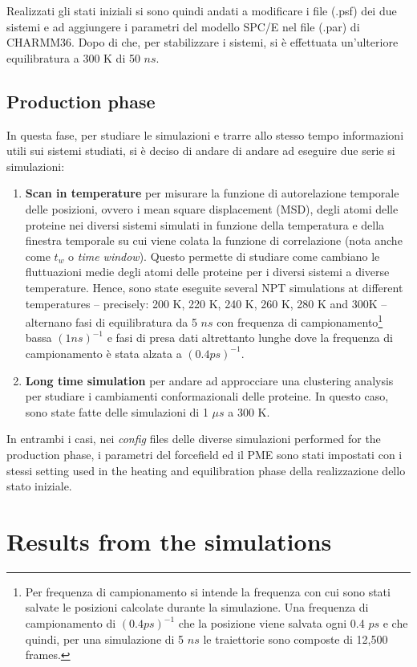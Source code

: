 Realizzati gli stati iniziali si sono quindi andati a modificare i file (.psf) dei due sistemi e ad aggiungere i parametri del modello SPC/E nel file (.par) di CHARMM36. Dopo di che, per stabilizzare i sistemi, si è effettuata un'ulteriore equilibratura a 300 K di 50 $ns$.

\subsection{Production phase}
In questa fase, per studiare le simulazioni e trarre allo stesso tempo informazioni utili sui sistemi studiati, si è deciso di andare di andare ad eseguire due serie si simulazioni:
\begin{enumerate}
\item \textbf{Scan in temperature} per misurare la funzione di autorelazione temporale delle posizioni, ovvero i mean square displacement (MSD), degli atomi delle proteine nei diversi sistemi simulati in funzione della temperatura e della finestra temporale su cui viene colata la funzione di correlazione (nota anche come $t_w$ o \textit{time window}). Questo permette di studiare come cambiano le fluttuazioni medie degli atomi delle proteine per i diversi sistemi a diverse temperature. Hence, sono state eseguite several NPT simulations at different temperatures -- precisely: 200 K, 220 K, 240 K, 260 K, 280 K and 300K -- alternano fasi di equilibratura da 5 $ns$ con frequenza di campionamento\footnote{Per frequenza di campionamento si intende la frequenza con cui sono stati salvate le posizioni calcolate durante la simulazione. Una frequenza di campionamento di $(0.4 ps)^{-1}$ che la posizione viene salvata ogni 0.4 $ps$ e che quindi, per una simulazione di 5 $ns$ le traiettorie sono composte di 12,500 frames.} bassa $(1 ns)^{-1}$ e fasi di presa dati altrettanto lunghe dove la frequenza di campionamento è stata alzata a $(0.4 ps)^{-1}$. 
\item \textbf{Long time simulation} per andare ad approcciare una clustering analysis per studiare i cambiamenti conformazionali delle proteine. In questo caso, sono state fatte delle simulazioni di 1 $\mu s$ a 300 K. 
\end{enumerate}
In entrambi i casi, nei \textit{config} files delle diverse simulazioni performed for the production phase, i parametri del forcefield ed il PME sono stati impostati con i stessi setting used in the heating and equilibration phase della realizzazione dello stato iniziale.

\section{Results from the simulations}

